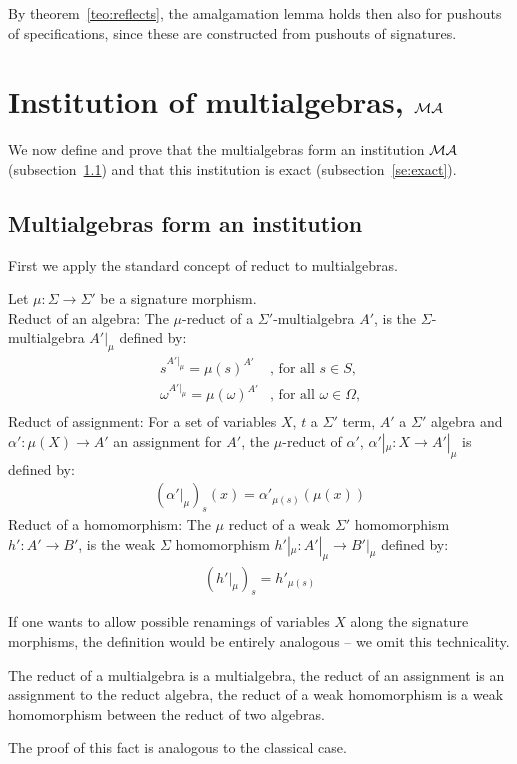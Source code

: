 By
theorem~\ref{teo:reflects}, the amalgamation lemma holds then also for pushouts of
specifications, since these are constructed from pushouts of signatures.

\section{Institution of multialgebras, ${\mathcal{MA}}$}
\label{sec:multi}
We now define and prove that the multialgebras form
an institution ${\mathcal{MA}}$ (subsection~\ref{se:instMA}) and that this
institution is exact (subsection~\ref{se:exact}).

\subsection{Multialgebras form an institution}\label{se:instMA}
First we apply the standard concept of reduct to multialgebras.
\begin{definition}
Let $\mu: \Sigma \to \Sigma'$ be a signature morphism.\\
Reduct of an algebra: The $\mu$-reduct
of a $\Sigma'$-multialgebra $A'$, is the $\Sigma$-multialgebra $A'|_\mu$
defined by:
\[ \begin{array}{ll} 
	s^{{A'}|_\mu} = \mu(s)^{A'} 		&\mbox{, for all $s \in S$,} \\
 	\omega^{{A'}|_\mu} = \mu(\omega)^{A'} 	&\mbox{, for all $\omega \in \Omega$,}\\
\end{array} \]
Reduct of assignment:
For a set of variables $X$, $t$ a $\Sigma'$ term, $A'$ a $\Sigma'$ algebra
and $\alpha': \mu(X) \to A'$ an assignment for $A'$, the $\mu$-reduct of
$\alpha'$, $\alpha' |_\mu:X\to A'|_\mu$ is defined by:
\[	\begin{array}{l}
	(\alpha' |_\mu)_{s}(x) = \alpha'_{\mu(s)}(\mu(x))
	\end{array}
\]
Reduct of a homomorphism: The $\mu$ reduct of a weak $\Sigma'$ homomorphism
$h':A' \to B'$, is the weak $\Sigma$ homomorphism $h'|_\mu: A'|_\mu \to  B'|_\mu$ defined by:
\[ \begin{array}{l} 
 	(h'|_\mu)_s = h'_{\mu(s)}
\end{array} \]
\end{definition}
If one wants to allow possible renamings of variables $X$ along the signature
morphisms, the definition would be entirely analogous -- we omit this technicality.
%
\begin{fact} The reduct of a multialgebra is a multialgebra, the reduct of an
assignment is an  assignment to the reduct algebra, the reduct of a weak
homomorphism is a weak homomorphism between the reduct of two algebras.%
\end{fact}
The proof of this fact is analogous to the classical case. 

